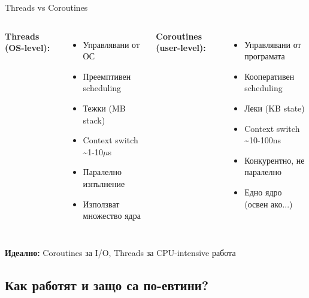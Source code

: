 \documentclass[aspectratio=169]{beamer}
\begin{document}
\begin{frame}{Threads vs Coroutines}
\begin{columns}
\textbf{Threads (OS-level):}
\begin{itemize}
    \item Управлявани от ОС
    \item Преемптивен scheduling
    \item Тежки (MB stack)
    \item Context switch \textasciitilde 1-10$\mu$s
    \item Паралелно изпълнение
    \item Използват множество ядра
\end{itemize}

\textbf{Coroutines (user-level):}
\begin{itemize}
    \item Управлявани от програмата
    \item Кооперативен scheduling
    \item Леки (KB state)
    \item Context switch \textasciitilde 10-100ns
    \item Конкурентно, не паралелно
    \item Едно ядро (освен ако...)
\end{itemize}
\end{columns}

\vspace{0.5cm}
\centering
\textbf{Идеално:} Coroutines за I/O, Threads за CPU-intensive работа
\end{frame}

\subsection{Как работят и защо са по-евтини?}
\end{document}
